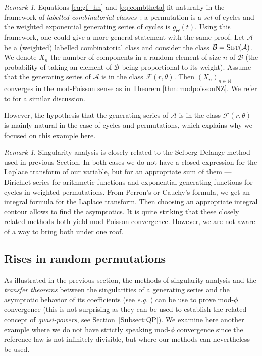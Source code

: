 \documentclass[12pt,a4paper,reqno]{amsart}
\theoremstyle{remark}
\newtheorem{remark}[lemma]{Remark}
\newcommand{\N}{\mathbb{N}}
\DeclareMathOperator\Set{\textsc{Set}}
\begin{document}
\begin{remark}
    Equations \eqref{eq:gf_hn} and \eqref{eq:combtheta} fit naturally in the framework of 
    {\em labelled combinatorial classes}~\cite[Chapter II]{FSe09}:
    a permutation is a {\em set} of cycles and the weighted exponential generating series of cycles is $g_{\Theta}(t)$.
    Using this framework, one could give a more general statement with the same proof.
    Let $\mathcal{A}$ be a (weighted) labelled combinatorial class and
    consider the class $\mathcal{B}=\Set(\mathcal{A})$.
    We denote $X_n$ the number of components in a random element of size $n$ of $\mathcal{B}$
    (the probability of taking an element of $\mathcal{B}$ being proportional to its weight).
    Assume that the generating series of $\mathcal{A}$ is in the class $\mathcal{F}(r,\theta)$.
    Then $(X_n)_{n \in \N}$ converges in the mod-Poisson sense as in Theorem \ref{thm:modpoissonNZ}.
    We refer to \cite[Section 4.1]{Hwa96} for a similar discussion.\medskip

   However, the hypothesis that the generating series of $\mathcal{A}$ is in the class $\mathcal{F}(r,\theta)$
   is mainly natural in the case of cycles and permutations, which explains why we
   focused on this example here.
\end{remark}

\begin{remark}
   Singularity analysis is closely related to the Selberg-Delange method 
   used in previous Section.
   In both cases we do not have a closed expression for the Laplace transform of our variable,
   but for an appropriate sum of them --- Dirichlet series for arithmetic functions
   and exponential generating functions for cycles in weighted permutations.
    From Perron's or Cauchy's formula, 
    we get an integral formula for the Laplace transform.
    Then choosing an appropriate integral contour allows to find the asymptotics.
    It is quite striking that these closely related methods both
    yield mod-Poisson convergence. However, we are not aware of a way to bring both under one roof.
\end{remark}
\bigskip


\subsection{Rises in random permutations}
\label{subsec:rises}
As illustrated in the previous section,
the methods of singularity analysis and the \emph{transfer theorems} between the singularities of a generating series and the asymptotic behavior of its coefficients (see \emph{e.g.} \cite[Chapter VI]{FSe09})
can be use to prove mod-$\phi$ convergence
(this is not surprising as they can be used to establish the related concept of {\em quasi-powers},
see Section~\ref{Subsect:QP}).
We examine here another example where we do not have strictly speaking mod-$\phi$ convergence 
since the reference law is not infinitely divisible,
but where our methods can nevertheless be used.
\end{document}
